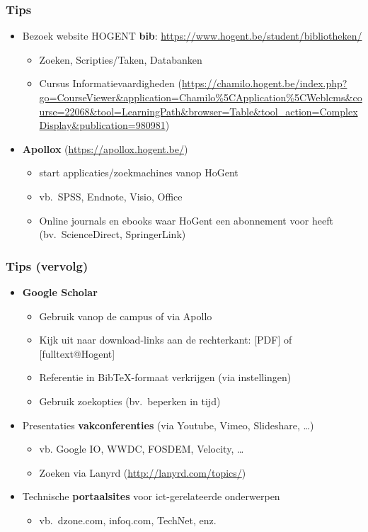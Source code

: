 \documentclass[aspectratio=169]{beamer}
\begin{document}
\begin{frame}
  \frametitle{Tips}
  
  \begin{itemize}
    \item<+-> Bezoek website HOGENT \textbf{bib}: \url{https://www.hogent.be/student/bibliotheken/}
    \begin{itemize}
      \item Zoeken, Scripties/Taken, Databanken
      \item Cursus Informatievaardigheden (\url{https://chamilo.hogent.be/index.php?go=CourseViewer\&application=Chamilo\%5CApplication\%5CWeblcms\&course=22068\&tool=LearningPath\&browser=Table\&tool_action=ComplexDisplay\&publication=980981})
    \end{itemize}
    \item<+-> \textbf{Apollox} (\url{https://apollox.hogent.be/})
    \begin{itemize}
      \item start applicaties/zoekmachines vanop HoGent
      \item vb.~SPSS, Endnote, Visio, Office
      \item Online journals en ebooks waar HoGent een abonnement voor heeft (bv.~ScienceDirect, SpringerLink)
    \end{itemize}
  \end{itemize}
\end{frame}

\begin{frame}
  \frametitle{Tips (vervolg)}
  
  \begin{itemize}
    \item<+-> \textbf{Google Scholar}
      \begin{itemize}
        \item Gebruik vanop de campus of via Apollo
        \item Kijk uit naar download-links aan de rechterkant: [PDF] of [fulltext@Hogent]
        \item Referentie in Bib{\TeX}-formaat verkrijgen (via instellingen)
        \item Gebruik zoekopties (bv.~beperken in tijd)
      \end{itemize}
    \item Presentaties \textbf{vakconferenties} (via Youtube, Vimeo, Slideshare, \dots)
    \begin{itemize}
      \item vb. Google IO, WWDC, FOSDEM, Velocity, \dots
      \item Zoeken via Lanyrd (\url{http://lanyrd.com/topics/})
    \end{itemize}
    \item<+-> Technische \textbf{portaalsites} voor ict-gerelateerde onderwerpen
    \begin{itemize}
      \item vb.~dzone.com, infoq.com, TechNet, enz.
    \end{itemize}
  \end{itemize}
\end{frame}
\end{document}
